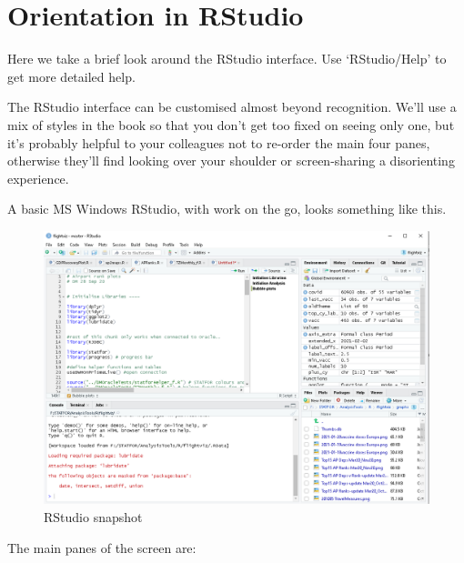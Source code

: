 \documentclass[
]{book}
\begin{document}
\hypertarget{rstudio}{%
\section{Orientation in RStudio}\label{rstudio}}

Here we take a brief look around the RStudio interface. Use `RStudio/Help' to get more detailed help.

The RStudio interface can be customised almost beyond recognition. We'll use a mix of styles in the book so that you don't get too fixed on seeing only one, but it's probably helpful to your colleagues not to re-order the main four panes, otherwise they'll find looking over your shoulder or screen-sharing a disorienting experience.

A basic MS Windows RStudio, with work on the go, looks something like this.

\begin{figure}
\centering
\includegraphics{images/RStudio.png}
\caption{RStudio snapshot}
\end{figure}

The main panes of the screen are:
\end{document}
